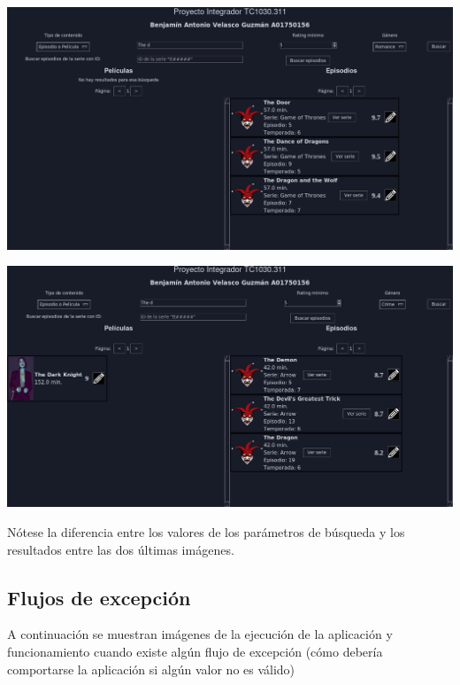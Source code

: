 \begin{center}
\includegraphics[width=0.9\linewidth]{interface-search-romance}

\includegraphics[width=0.9\linewidth]{interface-search-crime}
\end{center}

Nótese la diferencia entre los valores de los parámetros de búsqueda y los resultados entre las dos últimas imágenes.

\subsection{Flujos de excepción}
A continuación se muestran imágenes de la ejecución de la aplicación y funcionamiento cuando existe algún flujo de excepción (cómo debería comportarse la aplicación si algún valor no es válido)

